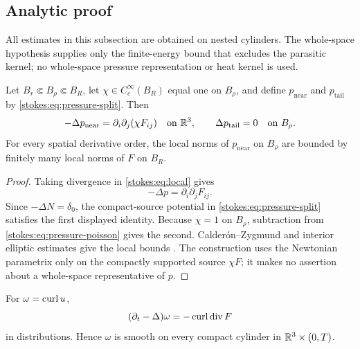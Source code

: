 \subsection{Analytic proof}
\label{sec:stokes-analytic-proof}

All estimates in this subsection are obtained on nested cylinders.  The
whole-space hypothesis supplies only the finite-energy bound that excludes the
parasitic kernel; no whole-space pressure representation or heat kernel is
used.

\begin{lemma}
\label{stokes:lem:pressure-split}
Let \(B_r\Subset B_\rho\Subset B_R\), let
\(\chi\in C_c^\infty(B_R)\) equal one on \(B_\rho\), and define
\(p_{\mathrm{near}}\) and \(p_{\mathrm{tail}}\) by
\eqref{stokes:eq:pressure-split}.  Then
\[
 -\Delta p_{\mathrm{near}}
 =\partial_i\partial_j(\chi F_{ij})
 \quad\hbox{on }\mathbb R^3,
 \qquad
 \Delta p_{\mathrm{tail}}=0
 \quad\hbox{on }B_\rho.
\]
For every spatial derivative order, the local norms of
\(p_{\mathrm{near}}\) on \(B_\rho\) are bounded by finitely many local norms
of \(F\) on \(B_R\).
\end{lemma}

\begin{proof}
Taking divergence in \eqref{stokes:eq:local} gives
\begin{equation}\label{stokes:eq:pressure-poisson}
 -\Delta p=\partial_i\partial_jF_{ij}.
\end{equation}
Since \(-\Delta N=\delta_0\), the compact-source potential in
\eqref{stokes:eq:pressure-split} satisfies the first displayed identity.
Because \(\chi=1\) on \(B_\rho\), subtraction from
\eqref{stokes:eq:pressure-poisson} gives the second.  Calder\'on--Zygmund and
interior elliptic estimates give the local bounds
\cite{CalderonZygmund1952,Stein1970}.  The construction uses the Newtonian
parametrix only on the compactly supported source \(\chi F\); it makes no
assertion about a whole-space representative of \(p\).
\end{proof}

\begin{lemma}
\label{stokes:lem:vorticity}
For \(\omega=\operatorname{curl} u\),
\begin{equation}\label{stokes:eq:vorticity}
 (\partial_t-\Delta)\omega=-\operatorname{curl}\operatorname{div} F
\end{equation}
in distributions.  Hence \(\omega\) is smooth on every compact cylinder in
\(\mathbb R^3\times(0,T)\).
\end{lemma}

